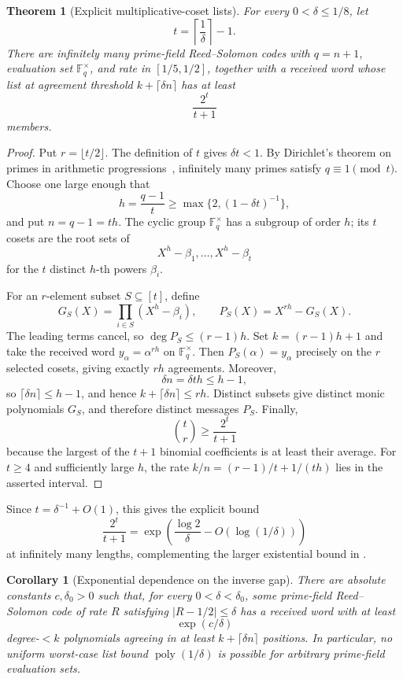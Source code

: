 \documentclass[11pt,letterpaper]{article}
\newtheorem{theorem}{Theorem}[section]
\newtheorem{corollary}[corollary]{Corollary}
\theoremstyle{definition}
\newcommand{\F}{\mathbb{F}}
\newcommand{\poly}{\operatorname{poly}}
\begin{document}
\begin{theorem}[Explicit multiplicative-coset lists]
\label{thm:multiplicative-coset-lists}
For every $0<\delta\le1/8$, let
\[
  t=\left\lceil\frac1\delta\right\rceil-1.
\]
There are infinitely many prime-field Reed--Solomon codes with
$q=n+1$, evaluation set $\F_q^\times$, and rate in
$[1/5,1/2]$, together with a received word whose list at agreement
threshold $k+\lceil\delta n\rceil$ has at least
\begin{equation}
  \frac{2^t}{t+1}
  \label{eq:coset-list-lower-bound}
\end{equation}
members.
\end{theorem}

\begin{proof}
Put $r=\lfloor t/2\rfloor$. The definition of \(t\) gives \(\delta t<1\).
By Dirichlet's theorem on primes in arithmetic
progressions~\cite{Dirichlet1837}, infinitely many primes satisfy
$q\equiv1\pmod t$. Choose one
large enough that
\[
  h=\frac{q-1}{t}
  \ge\max\{2,(1-\delta t)^{-1}\},
\]
and put $n=q-1=th$. The cyclic group
$\F_q^\times$ has a subgroup of order $h$; its $t$ cosets are the root
sets of
\[
  X^h-\beta_1,\ldots,X^h-\beta_t
\]
for the $t$ distinct $h$-th powers $\beta_i$.

For an $r$-element subset $S\subseteq[t]$, define
\[
  G_S(X)=\prod_{i\in S}(X^h-\beta_i),
  \qquad
  P_S(X)=X^{rh}-G_S(X).
\]
The leading terms cancel, so $\deg P_S\le(r-1)h$. Set
$k=(r-1)h+1$ and take the received word $y_\alpha=\alpha^{rh}$ on
$\F_q^\times$. Then $P_S(\alpha)=y_\alpha$ precisely on the $r$
selected cosets, giving exactly $rh$ agreements. Moreover,
\[
  \delta n=\delta th\le h-1,
\]
so $\lceil\delta n\rceil\le h-1$, and hence
$k+\lceil\delta n\rceil\le rh$. Distinct subsets give distinct monic
polynomials $G_S$, and therefore distinct messages $P_S$. Finally,
\[
  \binom tr\ge\frac{2^t}{t+1}
\]
because the largest of the $t+1$ binomial coefficients is at least their
average. For $t\ge4$ and sufficiently large $h$, the rate
$k/n=(r-1)/t+1/(th)$ lies in the asserted interval.
\end{proof}

Since \(t=\delta^{-1}+O(1)\), this gives the explicit bound
\[
  \frac{2^t}{t+1}
  =
  \exp\left(\frac{\log2}{\delta}-O(\log(1/\delta))\right)
\]
at infinitely many lengths, complementing the larger existential bound in
.

\begin{corollary}[Exponential dependence on the inverse gap]
\label{cor:exponential-inverse-gap-list}
There are absolute constants \(c,\delta_0>0\) such that, for every
\(0<\delta<\delta_0\), some prime-field Reed--Solomon code of rate
\(R\) satisfying \(|R-1/2|\le\delta\) has a received word with at least
\[
  \exp(c/\delta)
\]
degree-\(<k\) polynomials agreeing in at least
\(k+\lceil\delta n\rceil\) positions.  In particular, no uniform
worst-case list bound \(\poly(1/\delta)\) is possible for arbitrary
prime-field evaluation sets.
\end{corollary}
\end{document}
